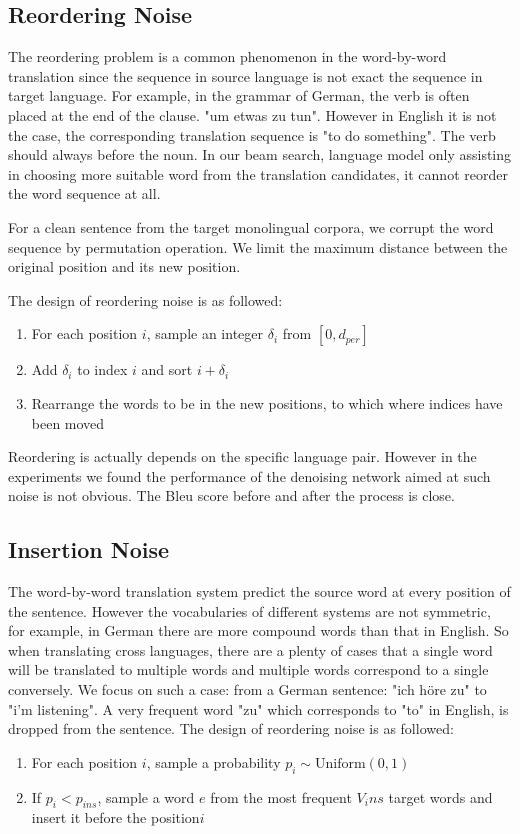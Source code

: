 	
	\subsection{Reordering Noise}
	The reordering problem is a common phenomenon in the word-by-word translation since the sequence in source language is not exact the sequence in target language. 
	For example, in  the grammar of German, the verb is often placed at the end of the clause. 
	"um etwas zu tun". However in English it is not the case, the corresponding translation sequence is "to do something". The verb should always before the noun.
	In our beam search, language model only assisting in choosing  more suitable word from the translation candidates, it cannot reorder the word sequence at all.
	
	For a clean sentence from the target monolingual corpora, we corrupt the word sequence by permutation operation. We limit the maximum distance between the original position and its new position.
	
	The design of reordering noise is as followed:
	\begin{enumerate}
		\item For each position ${i}$, sample an integer ${\delta_i}$ from ${[0, d_{per}]}$
		\item Add ${\delta_{i}}$ to index ${i}$ and sort ${i+\delta_{i}}$
		\item Rearrange the words to be in the new positions, to which where indices have been moved
	\end{enumerate}

	Reordering is actually depends on the specific language pair. However in the experiments we found the performance of the denoising network aimed at such noise is not obvious. The Bleu score before and after the process is close.
	\subsection{Insertion Noise}
	
		
	The word-by-word translation system predict the source word at every position of the sentence. However the vocabularies of different systems are not symmetric, for example, in German there are more compound words than that in English. So when translating cross languages, there are a plenty of cases that a single word will be translated to multiple words and multiple words correspond to a single conversely. We focus on such a case: from a German sentence: "ich höre zu" to "i'm listening". A very frequent word "zu" which corresponds to "to" in English, is dropped from the sentence. The design of reordering noise is as followed:
	\begin{enumerate}	
		\item For each position ${i}$, sample a probability ${p_i \sim \textrm{Uniform}(0,1)}$
		\item If ${p_i} < p_{ins}$, sample a word ${e}$ from the most frequent ${V_ins}$ target words and insert it before the position${i}$
	\end{enumerate}

